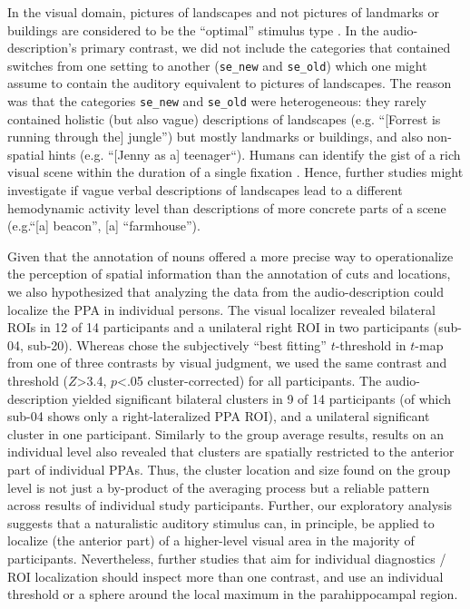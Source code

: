 \documentclass[english]{article}
\begin{document}

In the visual domain, pictures of landscapes and not pictures of landmarks or
buildings are considered to be the ``optimal'' stimulus type
\citep{epstein2008parahippocampal}.
In the audio-description's primary contrast, we did not include the categories
that contained switches from one setting to another (\texttt{se\_new} and
\texttt{se\_old}) which one might assume to contain the auditory equivalent to
pictures of landscapes.
The reason was that the categories \texttt{se\_new} and \texttt{se\_old} were
heterogeneous: they rarely contained holistic (but also vague) descriptions of
landscapes (e.g.  ``[Forrest is running through the] jungle'') but mostly
landmarks or buildings, and also non-spatial hints (e.g. ``[Jenny as a]
teenager``).
Humans can identify the gist of a rich visual scene within the duration of a
single fixation \citep{henderson2003human}.
%
Hence, further studies might investigate if vague verbal descriptions of
landscapes lead to a different hemodynamic activity level than descriptions of
more concrete parts of a scene (e.g.``[a] beacon'', [a] ``farmhouse'').


Given that the annotation of nouns offered a more precise way to operationalize
the perception of spatial information than the annotation of cuts and locations,
we also hypothesized that analyzing the data from the audio-description could
localize the PPA in individual persons.
The visual localizer \citep{sengupta2016extension} revealed bilateral ROIs in 12
of 14 participants and a unilateral right ROI in two participants (sub-04, sub-20).
%
Whereas \citep{sengupta2016extension} chose the subjectively ``best fitting''
$t$-threshold in $t$-map from one of three contrasts by visual judgment, we used
the same contrast and threshold ($Z$>3.4, $p$<.05 cluster-corrected) for all
participants.
The audio-description yielded significant bilateral clusters in 9 of 14 participants
(of which sub-04 shows only a right-lateralized PPA ROI), and a unilateral
significant cluster in one participant.
Similarly to the group average results, results on an individual level also
revealed that clusters are spatially restricted to the anterior part of
individual PPAs.
Thus, the cluster location and size found on the group level is not just a
by-product of the averaging process but a reliable pattern across results of
individual study participants.
Further, our exploratory analysis suggests that a naturalistic auditory stimulus
can, in principle, be applied to localize (the anterior part) of a higher-level
visual area in the majority of participants.
Nevertheless, further studies that aim for individual diagnostics / ROI
localization should inspect more than one contrast, and use an individual
threshold or a sphere around the local maximum \citep{poldrack2007region} in the
parahippocampal region.
\end{document}
